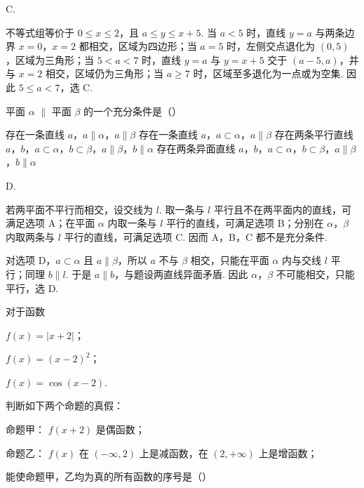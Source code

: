 \begin{answer}
C.
\end{answer}

\begin{solution}
不等式组等价于 \(0\leqslant x\leqslant2\)，且 \(a\leqslant y\leqslant x+5\). 当 \(a<5\) 时，直线 \(y=a\) 与两条边界 \(x=0\)，\(x=2\) 都相交，区域为四边形；当 \(a=5\) 时，左侧交点退化为 \((0,5)\)，区域为三角形；当 \(5<a<7\) 时，直线 \(y=a\) 与 \(y=x+5\) 交于 \((a-5,a)\)，并与 \(x=2\) 相交，区域仍为三角形；当 \(a\geqslant7\) 时，区域至多退化为一点或为空集. 因此 \(5\leqslant a<7\)，选 C.
\end{solution}

\begin{problem}
平面 \(\alpha\) \(\parallel\) 平面 \(\beta\) 的一个充分条件是（\quad）

\choices
    {存在一条直线 \(a\)，\(a \parallel \alpha\)，\(a \parallel \beta\)}
    {存在一条直线 \(a\)，\(a \subset \alpha\)，\(a \parallel \beta\)}
    {存在两条平行直线 \(a\)，\(b\)，\(a \subset \alpha\)，\(b \subset \beta\)，\(a \parallel \beta\)，\(b \parallel \alpha\)}
    {存在两条异面直线 \(a\)，\(b\)，\(a \subset \alpha\)，\(b \subset \beta\)，\(a \parallel \beta\)，\(b \parallel \alpha\)}
\end{problem}

\begin{answer}
D.
\end{answer}

\begin{solution}
若两平面不平行而相交，设交线为 \(l\). 取一条与 \(l\) 平行且不在两平面内的直线，可满足选项 A；在平面 \(\alpha\) 内取一条与 \(l\) 平行的直线，可满足选项 B；分别在 \(\alpha\)，\(\beta\) 内取两条与 \(l\) 平行的直线，可满足选项 C. 因而 A，B，C 都不是充分条件.

对选项 D，\(a\subset\alpha\) 且 \(a\parallel\beta\)，所以 \(a\) 不与 \(\beta\) 相交，只能在平面 \(\alpha\) 内与交线 \(l\) 平行；同理 \(b\parallel l\). 于是 \(a\parallel b\)，与题设两直线异面矛盾. 因此 \(\alpha\)，\(\beta\) 不可能相交，只能平行，选 D.
\end{solution}

\begin{problem}
对于函数

\begin{circlelist}
\item \( f(x) = |x + 2| \)；
\item \( f(x) = (x - 2)^2 \)；
\item \( f(x) = \cos (x - 2) \).
\end{circlelist}

判断如下两个命题的真假： 

命题甲： \( f(x+2) \) 是偶函数； 

命题乙： \( f(x) \) 在 \( (-\infty,2) \) 上是减函数，在 \( (2,+\infty) \) 上是增函数； 

能使命题甲，乙均为真的所有函数的序号是（\quad）

\choices
    {}
    {}
    {}
    {}
\end{problem}

